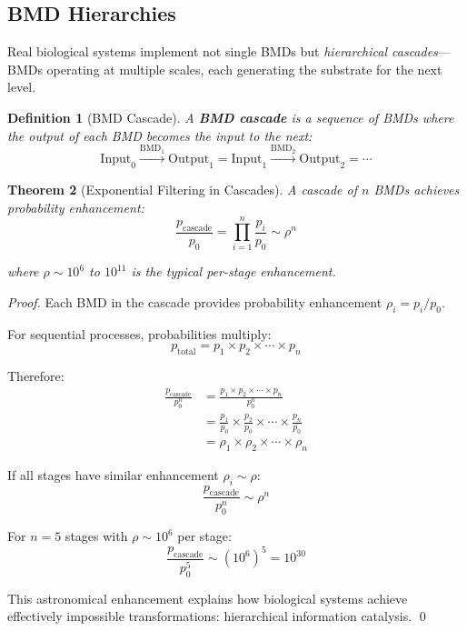 \documentclass[11pt]{article}
\newtheorem{theorem}{Theorem}[section]
\newtheorem{definition}[theorem]{Definition}
\theoremstyle{remark}
\begin{document}
\subsection{BMD Hierarchies}

Real biological systems implement not single BMDs but \textit{hierarchical cascades}—BMDs operating at multiple scales, each generating the substrate for the next level.

\begin{definition}[BMD Cascade]
\label{def:bmd_cascade}
A \textbf{BMD cascade} is a sequence of BMDs where the output of each BMD becomes the input to the next:
\begin{equation}
\text{Input}_0 \xrightarrow{\text{BMD}_1} \text{Output}_1 = \text{Input}_1 \xrightarrow{\text{BMD}_2} \text{Output}_2 = \cdots
\end{equation}
\end{definition}

\begin{theorem}[Exponential Filtering in Cascades]
\label{thm:exponential_filtering}
A cascade of $n$ BMDs achieves probability enhancement:
\begin{equation}
\frac{p_{\text{cascade}}}{p_0} = \prod_{i=1}^n \frac{p_i}{p_0} \sim \rho^n
\end{equation}

where $\rho \sim 10^6$ to $10^{11}$ is the typical per-stage enhancement.
\end{theorem}

\begin{proof}
Each BMD in the cascade provides probability enhancement $\rho_i = p_i/p_0$.

For sequential processes, probabilities multiply:
\begin{equation}
p_{\text{total}} = p_1 \times p_2 \times \cdots \times p_n
\end{equation}

Therefore:
\begin{align}
\frac{p_{\text{cascade}}}{p_0^n} &= \frac{p_1 \times p_2 \times \cdots \times p_n}{p_0^n} \\
&= \frac{p_1}{p_0} \times \frac{p_2}{p_0} \times \cdots \times \frac{p_n}{p_0} \\
&= \rho_1 \times \rho_2 \times \cdots \times \rho_n
\end{align}

If all stages have similar enhancement $\rho_i \sim \rho$:
\begin{equation}
\frac{p_{\text{cascade}}}{p_0^n} \sim \rho^n
\end{equation}

For $n = 5$ stages with $\rho \sim 10^6$ per stage:
\begin{equation}
\frac{p_{\text{cascade}}}{p_0^5} \sim (10^6)^5 = 10^{30}
\end{equation}

This astronomical enhancement explains how biological systems achieve effectively impossible transformations: hierarchical information catalysis. \qed
\end{proof}
\end{document}
